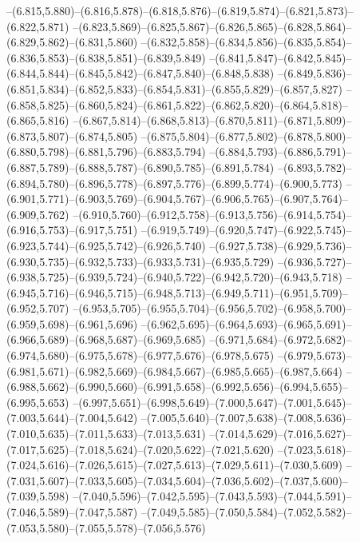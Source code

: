   --(6.815,5.880)--(6.816,5.878)--(6.818,5.876)--(6.819,5.874)--(6.821,5.873)--(6.822,5.871)%
  --(6.823,5.869)--(6.825,5.867)--(6.826,5.865)--(6.828,5.864)--(6.829,5.862)--(6.831,5.860)%
  --(6.832,5.858)--(6.834,5.856)--(6.835,5.854)--(6.836,5.853)--(6.838,5.851)--(6.839,5.849)%
  --(6.841,5.847)--(6.842,5.845)--(6.844,5.844)--(6.845,5.842)--(6.847,5.840)--(6.848,5.838)%
  --(6.849,5.836)--(6.851,5.834)--(6.852,5.833)--(6.854,5.831)--(6.855,5.829)--(6.857,5.827)%
  --(6.858,5.825)--(6.860,5.824)--(6.861,5.822)--(6.862,5.820)--(6.864,5.818)--(6.865,5.816)%
  --(6.867,5.814)--(6.868,5.813)--(6.870,5.811)--(6.871,5.809)--(6.873,5.807)--(6.874,5.805)%
  --(6.875,5.804)--(6.877,5.802)--(6.878,5.800)--(6.880,5.798)--(6.881,5.796)--(6.883,5.794)%
  --(6.884,5.793)--(6.886,5.791)--(6.887,5.789)--(6.888,5.787)--(6.890,5.785)--(6.891,5.784)%
  --(6.893,5.782)--(6.894,5.780)--(6.896,5.778)--(6.897,5.776)--(6.899,5.774)--(6.900,5.773)%
  --(6.901,5.771)--(6.903,5.769)--(6.904,5.767)--(6.906,5.765)--(6.907,5.764)--(6.909,5.762)%
  --(6.910,5.760)--(6.912,5.758)--(6.913,5.756)--(6.914,5.754)--(6.916,5.753)--(6.917,5.751)%
  --(6.919,5.749)--(6.920,5.747)--(6.922,5.745)--(6.923,5.744)--(6.925,5.742)--(6.926,5.740)%
  --(6.927,5.738)--(6.929,5.736)--(6.930,5.735)--(6.932,5.733)--(6.933,5.731)--(6.935,5.729)%
  --(6.936,5.727)--(6.938,5.725)--(6.939,5.724)--(6.940,5.722)--(6.942,5.720)--(6.943,5.718)%
  --(6.945,5.716)--(6.946,5.715)--(6.948,5.713)--(6.949,5.711)--(6.951,5.709)--(6.952,5.707)%
  --(6.953,5.705)--(6.955,5.704)--(6.956,5.702)--(6.958,5.700)--(6.959,5.698)--(6.961,5.696)%
  --(6.962,5.695)--(6.964,5.693)--(6.965,5.691)--(6.966,5.689)--(6.968,5.687)--(6.969,5.685)%
  --(6.971,5.684)--(6.972,5.682)--(6.974,5.680)--(6.975,5.678)--(6.977,5.676)--(6.978,5.675)%
  --(6.979,5.673)--(6.981,5.671)--(6.982,5.669)--(6.984,5.667)--(6.985,5.665)--(6.987,5.664)%
  --(6.988,5.662)--(6.990,5.660)--(6.991,5.658)--(6.992,5.656)--(6.994,5.655)--(6.995,5.653)%
  --(6.997,5.651)--(6.998,5.649)--(7.000,5.647)--(7.001,5.645)--(7.003,5.644)--(7.004,5.642)%
  --(7.005,5.640)--(7.007,5.638)--(7.008,5.636)--(7.010,5.635)--(7.011,5.633)--(7.013,5.631)%
  --(7.014,5.629)--(7.016,5.627)--(7.017,5.625)--(7.018,5.624)--(7.020,5.622)--(7.021,5.620)%
  --(7.023,5.618)--(7.024,5.616)--(7.026,5.615)--(7.027,5.613)--(7.029,5.611)--(7.030,5.609)%
  --(7.031,5.607)--(7.033,5.605)--(7.034,5.604)--(7.036,5.602)--(7.037,5.600)--(7.039,5.598)%
  --(7.040,5.596)--(7.042,5.595)--(7.043,5.593)--(7.044,5.591)--(7.046,5.589)--(7.047,5.587)%
  --(7.049,5.585)--(7.050,5.584)--(7.052,5.582)--(7.053,5.580)--(7.055,5.578)--(7.056,5.576)%
